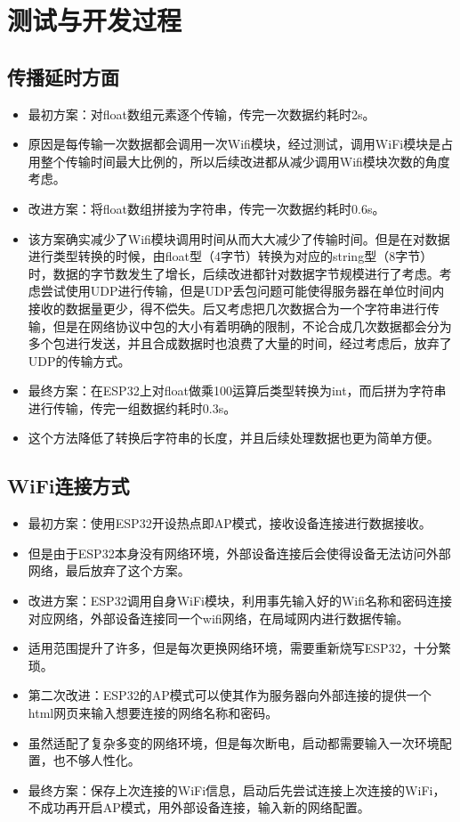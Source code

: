 \chapter{测试与开发过程}
\section{传播延时方面}
\begin{itemize}
    \item 最初方案：对float数组元素逐个传输，传完一次数据约耗时2s。
    \item 原因是每传输一次数据都会调用一次Wifi模块，经过测试，调用WiFi模块是占用整个传输时间最大比例的，所以后续改进都从减少调用Wifi模块次数的角度考虑。
    \item 改进方案：将float数组拼接为字符串，传完一次数据约耗时0.6s。
    \item 该方案确实减少了Wifi模块调用时间从而大大减少了传输时间。但是在对数据进行类型转换的时候，由float型（4字节）转换为对应的string型（8字节）时，数据的字节数发生了增长，后续改进都针对数据字节规模进行了考虑。考虑尝试使用UDP进行传输，但是UDP丢包问题可能使得服务器在单位时间内接收的数据量更少，得不偿失。后又考虑把几次数据合为一个字符串进行传输，但是在网络协议中包的大小有着明确的限制，不论合成几次数据都会分为多个包进行发送，并且合成数据时也浪费了大量的时间，经过考虑后，放弃了UDP的传输方式。
    \item 最终方案：在ESP32上对float做乘100运算后类型转换为int，而后拼为字符串进行传输，传完一组数据约耗时0.3s。
    \item 这个方法降低了转换后字符串的长度，并且后续处理数据也更为简单方便。
    \end{itemize}
\section{WiFi连接方式}
\begin{itemize}
    \item 最初方案：使用ESP32开设热点即AP模式，接收设备连接进行数据接收。
    \item 但是由于ESP32本身没有网络环境，外部设备连接后会使得设备无法访问外部网络，最后放弃了这个方案。
    \item 改进方案：ESP32调用自身WiFi模块，利用事先输入好的Wifi名称和密码连接对应网络，外部设备连接同一个wifi网络，在局域网内进行数据传输。
    \item 适用范围提升了许多，但是每次更换网络环境，需要重新烧写ESP32，十分繁琐。
    \item 第二次改进：ESP32的AP模式可以使其作为服务器向外部连接的提供一个html网页来输入想要连接的网络名称和密码。
    \item 虽然适配了复杂多变的网络环境，但是每次断电，启动都需要输入一次环境配置，也不够人性化。
    \item 最终方案：保存上次连接的WiFi信息，启动后先尝试连接上次连接的WiFi，不成功再开启AP模式，用外部设备连接，输入新的网络配置。
    \end{itemize}
